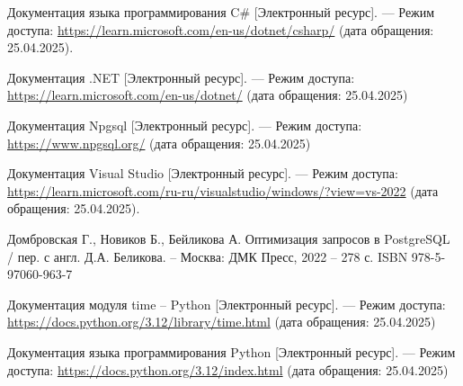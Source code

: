 \begin{thebibliography}{}
	 Документация языка программирования C\# [Электронный ресурс]. — Режим доступа: \url{https://learn.microsoft.com/en-us/dotnet/csharp/} (дата обращения: 25.04.2025).
	
	 Документация .NET [Электронный ресурс]. — Режим доступа: \url{https://learn.microsoft.com/en-us/dotnet/} (дата обращения: 25.04.2025)
	
	 Документация Npgsql [Электронный ресурс]. — Режим доступа: \url{https://www.npgsql.org/} (дата обращения: 25.04.2025)
	
	 Документация Visual Studio [Электронный ресурс]. — Режим доступа: \url{https://learn.microsoft.com/ru-ru/visualstudio/windows/?view=vs-2022} (дата обращения: 25.04.2025).
	
	
	 Домбровская Г., Новиков Б., Бейликова А. Оптимизация запросов в PostgreSQL / пер. с англ. Д.А. Беликова. -- Москва: ДМК Пресс, 2022 -- 278 с. ISBN 978-5-97060-963-7 
	
	
	 Документация модуля time -- Python [Электронный ресурс]. — Режим доступа: \url{https://docs.python.org/3.12/library/time.html} (дата обращения: 25.04.2025)
	
	 Документация языка программирования Python  [Электронный ресурс]. — Режим доступа: \url{https://docs.python.org/3.12/index.html} (дата обращения: 25.04.2025)
	
	
	
\end{thebibliography}
